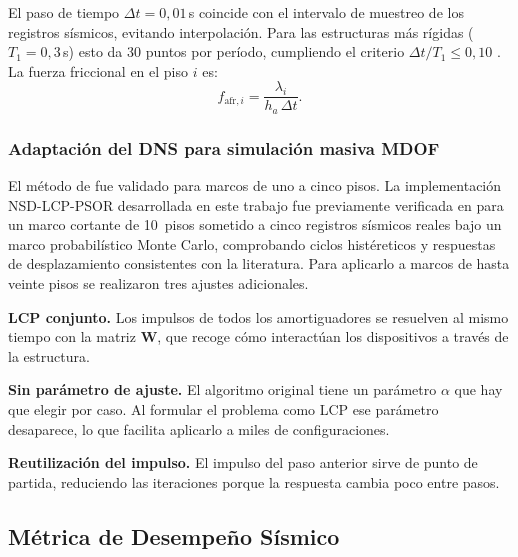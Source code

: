 \documentclass[preprint,12pt,authoryear]{elsarticle}
\newcommand{\ha}{h_a}
\begin{document}
El paso de tiempo $\Delta t = 0{,}01$\,s coincide con el intervalo de muestreo
de los registros sísmicos, evitando interpolación. Para las estructuras más
rígidas ($T_1 = 0{,}3$\,s) esto da 30 puntos por período, cumpliendo el criterio
$\Delta t / T_1 \leq 0{,}10$ \citep{chopra_dynamics_2015}. La fuerza friccional
en el piso $i$ es:
\begin{equation}
    f_{\mathrm{afr},i} = \frac{\lambda_i}{\ha\,\Delta t}.
    \label{eq:ffrict}
\end{equation}

\subsubsection*{Adaptación del DNS para simulación masiva MDOF}

El método de \citet{Namorado2024} fue validado para marcos de uno a cinco pisos.
La implementación NSD-LCP-PSOR desarrollada en este trabajo fue previamente
verificada en \citet{Ponce2026} para un marco cortante de 10~pisos sometido a
cinco registros sísmicos reales bajo un marco probabilístico Monte Carlo,
comprobando ciclos histéreticos y respuestas de desplazamiento consistentes con
la literatura. Para aplicarlo a marcos de hasta veinte pisos se realizaron tres
ajustes adicionales.

\textbf{LCP conjunto.} Los impulsos de todos los amortiguadores se resuelven al
mismo tiempo con la matriz $\bm{W}$, que recoge cómo interactúan los dispositivos
a través de la estructura.

\textbf{Sin parámetro de ajuste.} El algoritmo original tiene un parámetro
$\alpha$ que hay que elegir por caso. Al formular el problema como LCP ese
parámetro desaparece, lo que facilita aplicarlo a miles de configuraciones.

\textbf{Reutilización del impulso.} El impulso del paso anterior sirve de punto
de partida, reduciendo las iteraciones porque la respuesta cambia poco entre
pasos.

\subsection{Métrica de Desempeño Sísmico}
\label{sec:theory:metrica}
\end{document}
